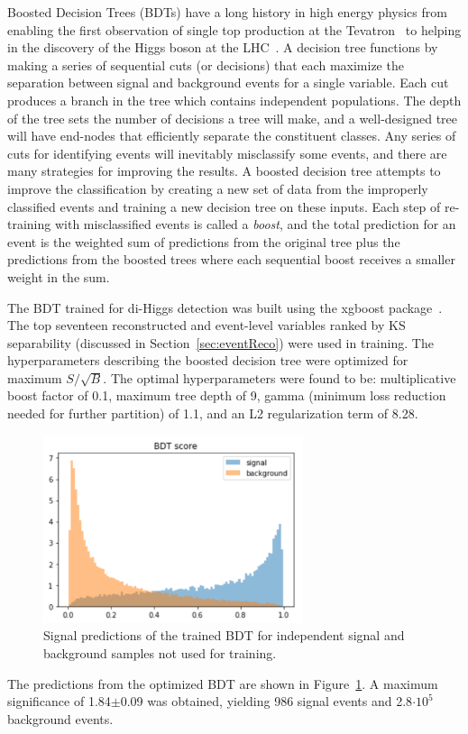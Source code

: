 \label{sec:BDT}
Boosted Decision Trees (BDTs) have a long history in high energy physics from enabling the first observation of single top production at the Tevatron~\cite{Abazov:2006gd, Aaltonen:2008sy} to helping in the discovery of the Higgs boson at the LHC~\cite{Aad_2012, Chatrchyan_2012}. A decision tree functions by making a series of sequential cuts (or decisions) that each maximize the separation between signal and background events for a single variable. Each cut produces a branch in the tree which contains independent populations. The depth of the tree sets the number of decisions a tree will make, and a well-designed tree will have end-nodes that efficiently separate the constituent classes. Any series of cuts for identifying events will inevitably misclassify some events, and there are many strategies for improving the results. A boosted decision tree attempts to improve the classification by creating a new set of data from the improperly classified events and training a new decision tree on these inputs. Each step of re-training with misclassified events is called a \textit{boost}, and the total prediction for an event is the weighted sum of predictions from the original tree plus the predictions from the boosted trees where each sequential boost receives a smaller weight in the sum.

The BDT trained for di-Higgs detection was built using the xgboost package~\cite{xgboost}. The top seventeen reconstructed and event-level variables ranked by KS separability (discussed in Section~\ref{sec:eventReco}) were used in training. The hyperparameters describing the boosted decision tree were optimized for maximum $S/\sqrt{B}$. The optimal hyperparameters were found to be: multiplicative boost factor of 0.1, maximum tree depth of 9, gamma (minimum loss reduction needed for further partition) of 1.1, and an L2 regularization term of 8.28.

\begin{figure}[!h]
\begin{center}
\includegraphics[width=3in]{BDT/bdt_pred}
\caption{Signal predictions of the trained BDT for independent signal and background samples not used for training.}
\label{fig:bdt_pred}
\end{center}
\end{figure}

The predictions from the optimized BDT are shown in Figure~\ref{fig:bdt_pred}. A maximum significance of 1.84$\pm$0.09 was obtained, yielding 986 signal events and 2.8$\cdot 10^5$ background events. 
